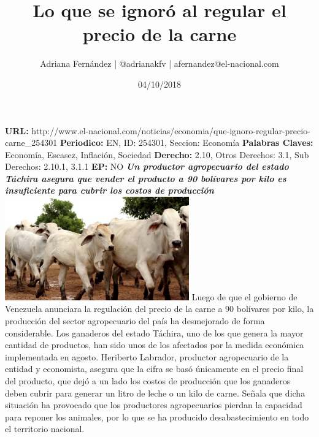 \documentclass{article}%
\title{\textbf{Lo que se ignoró al regular el precio de la carne}}%
\author{Adriana Fernández | @adrianakfv | afernandez@el{-}nacional.com}%
\date{04/10/2018}%
\begin{document}
%
\normalsize%
\maketitle%
\textbf{URL: }%
http://www.el{-}nacional.com/noticias/economia/que{-}ignoro{-}regular{-}precio{-}carne\_254301\newline%
%
\textbf{Periodico: }%
EN, %
ID: %
254301, %
Seccion: %
Economía\newline%
%
\textbf{Palabras Claves: }%
Economía, Escasez, Inflación, Sociedad\newline%
%
\textbf{Derecho: }%
2.10, %
Otros Derechos: %
3.1, %
Sub Derechos: %
2.10.1, 3.1.1\newline%
%
\textbf{EP: }%
NO\newline%
\newline%
%
\textbf{\textit{Un productor agropecuario del estado Táchira asegura que vender el producto a 90 bolívares por kilo es insuficiente para cubrir los costos de producción}}%
\newline%
\newline%
%
\includegraphics[width=300px]{1.jpg}%
\newline%
%
Luego de que el gobierno de Venezuela anunciara la regulación del precio de la carne a 90 bolívares por kilo, la producción del sector agropecuario del país ha desmejorado de forma considerable. Los ganaderos del estado Táchira, uno de los que genera la mayor cantidad de productos, han sido unos de los afectados por la medida económica implementada en agosto.%
\newline%
%
Heriberto Labrador, productor agropecuario de la entidad y economista, asegura que la cifra se basó únicamente en el precio final del producto, que dejó a un lado los costos de producción que los ganaderos deben cubrir para generar un litro de leche o un kilo de carne.%
\newline%
%
Señala que dicha situación ha provocado que los productores agropecuarios pierdan la capacidad para reponer los animales, por lo que se ha producido desabastecimiento en todo el territorio nacional.%
\newline%
\end{document}
